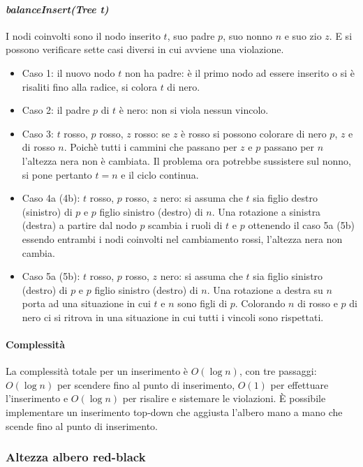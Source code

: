 \paragraph{\emph{balanceInsert(Tree t)}}
I nodi coinvolti sono il nodo inserito $t$, suo padre $p$, suo nonno $n$ e suo zio $z$. E si possono verificare sette casi diversi in cui avviene una
violazione.
\begin{multicols}{2}
\begin{itemize}
\item Caso 1: il nuovo nodo $t$ non ha padre: \`e il primo nodo ad essere inserito o si \`e risaliti fino alla radice, si colora $t$ di nero.
\item Caso 2: il padre $p$ di $t$ \`e nero: non si viola nessun vincolo.
\item Caso 3: $t$ rosso, $p$ rosso, $z$ rosso: se $z$ \`e rosso si possono colorare di nero $p$, $z$ e di rosso $n$. Poich\`e tutti i cammini che passano 
per $z$ e $p$ passano per $n$ l'altezza nera non \`e cambiata. Il problema ora potrebbe sussistere sul nonno, si pone pertanto $t=n$ e il ciclo continua.
\item Caso 4a (4b): $t$ rosso, $p$ rosso, $z$ nero: si assuma che $t$ sia figlio destro (sinistro) di $p$ e $p$ figlio sinistro (destro) di $n$. Una 
rotazione a sinistra (destra) a partire dal nodo $p$ scambia i ruoli di $t$ e $p$ ottenendo il caso 5a (5b) essendo entrambi i nodi coinvolti nel 
cambiamento rossi, l'altezza nera non cambia.
\item Caso 5a (5b): $t$ rosso, $p$ rosso, $z$ nero: si assuma che $t$ sia figlio sinistro (destro) di $p$ e $p$ figlio sinistro (destro) di $n$. Una 
rotazione a destra su $n$ porta ad una situazione in cui $t$ e $n$ sono figli di $p$. Colorando $n$ di rosso e $p$ di nero ci si ritrova in una situazione
in cui tutti i vincoli sono rispettati. 
\end{itemize}
\end{multicols}

\newpage
\paragraph{Complessit\`a}
La complessit\`a totale per un inserimento \`e $O(\log n)$, con tre passaggi: $O(\log n)$ per scendere fino al punto di inserimento, $O(1)$ per effettuare
l'inserimento e $O(\log n)$ per risalire e sistemare le violazioni. \`E possibile implementare un inserimento top-down che aggiusta l'albero mano a mano 
che scende fino al punto di inserimento.
\subsubsection{Altezza albero red-black}

